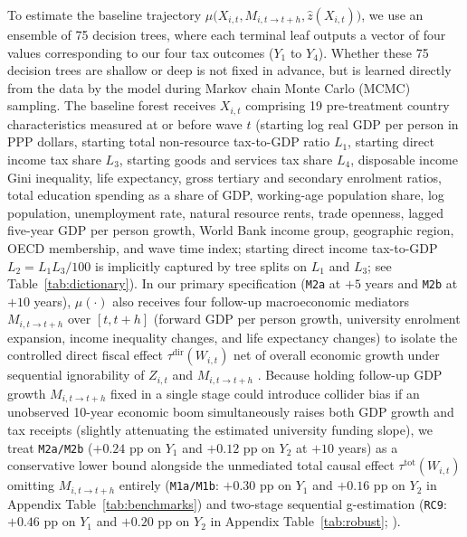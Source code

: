 \documentclass[11pt,a4paper]{article}
\begin{document}
To estimate the baseline trajectory $\mu\bigl(X_{i,t}, M_{i,t\to t+h}, \hat{z}(X_{i,t})\bigr)$, we use an ensemble of 75 decision trees, where each terminal leaf outputs a vector of four values corresponding to our four tax outcomes ($Y_1$ to $Y_4$). Whether these 75 decision trees are shallow or deep is not fixed in advance, but is learned directly from the data by the model during Markov chain Monte Carlo (MCMC) sampling. The baseline forest receives $X_{i,t}$ comprising 19 pre-treatment country characteristics measured at or before wave $t$ (starting log real GDP per person in PPP dollars, starting total non-resource tax-to-GDP ratio $L_1$, starting direct income tax share $L_3$, starting goods and services tax share $L_4$, disposable income Gini inequality, life expectancy, gross tertiary and secondary enrolment ratios, total education spending as a share of GDP, working-age population share, log population, unemployment rate, natural resource rents, trade openness, lagged five-year GDP per person growth, World Bank income group, geographic region, OECD membership, and wave time index; starting direct income tax-to-GDP $L_2 = L_1 L_3 / 100$ is implicitly captured by tree splits on $L_1$ and $L_3$; see Table~\ref{tab:dictionary}). In our primary specification (\texttt{M2a} at $+5$ years and \texttt{M2b} at $+10$ years), $\mu(\cdot)$ also receives four follow-up macroeconomic mediators $M_{i,t\to t+h}$ over $[t, t+h]$ (forward GDP per person growth, university enrolment expansion, income inequality changes, and life expectancy changes) to isolate the controlled direct fiscal effect $\tau^{\text{dir}}(W_{i,t})$ net of overall economic growth under sequential ignorability of $Z_{i,t}$ and $M_{i,t\to t+h}$ \citep{imai2010general, acharya2016explaining, vanderweele2016mediation}. Because holding follow-up GDP growth $M_{i,t\to t+h}$ fixed in a single stage could introduce collider bias if an unobserved 10-year economic boom simultaneously raises both GDP growth and tax receipts (slightly attenuating the estimated university funding slope), we treat \texttt{M2a/M2b} ($+0.24$ pp on $Y_1$ and $+0.12$ pp on $Y_2$ at $+10$ years) as a conservative lower bound alongside the unmediated total causal effect $\tau^{\text{tot}}(W_{i,t})$ omitting $M_{i,t\to t+h}$ entirely (\texttt{M1a/M1b}: $+0.30$ pp on $Y_1$ and $+0.16$ pp on $Y_2$ in Appendix Table~\ref{tab:benchmarks}) and two-stage sequential g-estimation (\texttt{RC9}: $+0.46$ pp on $Y_1$ and $+0.20$ pp on $Y_2$ in Appendix Table~\ref{tab:robust}; \citealt{acharya2016explaining}).
\end{document}
